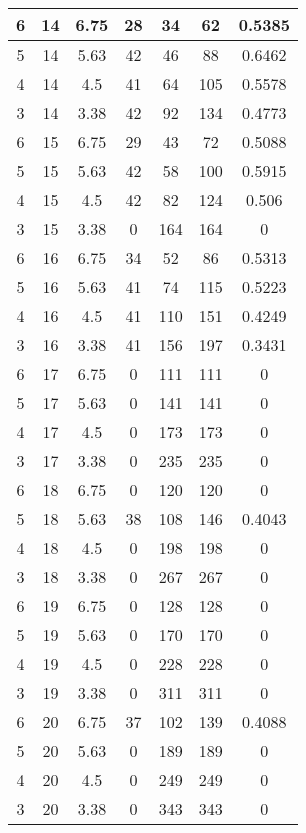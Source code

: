 \documentclass[letterpaper, 12pt]{article}
\begin{document}
\begin{longtable}{|c|c|c|c|c|c|c|}
\hline
6 & 14 & 6.75 & 28 & 34 & 62 & 0.5385 \\
\hline
5 & 14 & 5.63 & 42 & 46 & 88 & 0.6462 \\
\hline
4 & 14 & 4.5 & 41 & 64 & 105 & 0.5578 \\
\hline
3 & 14 & 3.38 & 42 & 92 & 134 & 0.4773 \\
\hline
6 & 15 & 6.75 & 29 & 43 & 72 & 0.5088 \\
\hline
5 & 15 & 5.63 & 42 & 58 & 100 & 0.5915 \\
\hline
4 & 15 & 4.5 & 42 & 82 & 124 & 0.506 \\
\hline
3 & 15 & 3.38 & 0 & 164 & 164 & 0 \\
\hline
6 & 16 & 6.75 & 34 & 52 & 86 & 0.5313 \\
\hline
5 & 16 & 5.63 & 41 & 74 & 115 & 0.5223 \\
\hline
4 & 16 & 4.5 & 41 & 110 & 151 & 0.4249 \\
\hline
3 & 16 & 3.38 & 41 & 156 & 197 & 0.3431 \\
\hline
6 & 17 & 6.75 & 0 & 111 & 111 & 0 \\
\hline
5 & 17 & 5.63 & 0 & 141 & 141 & 0 \\
\hline
4 & 17 & 4.5 & 0 & 173 & 173 & 0 \\
\hline
3 & 17 & 3.38 & 0 & 235 & 235 & 0 \\
\hline
6 & 18 & 6.75 & 0 & 120 & 120 & 0 \\
\hline
5 & 18 & 5.63 & 38 & 108 & 146 & 0.4043 \\
\hline
4 & 18 & 4.5 & 0 & 198 & 198 & 0 \\
\hline
3 & 18 & 3.38 & 0 & 267 & 267 & 0 \\
\hline
6 & 19 & 6.75 & 0 & 128 & 128 & 0 \\
\hline
5 & 19 & 5.63 & 0 & 170 & 170 & 0 \\
\hline
4 & 19 & 4.5 & 0 & 228 & 228 & 0 \\
\hline
3 & 19 & 3.38 & 0 & 311 & 311 & 0 \\
\hline
6 & 20 & 6.75 & 37 & 102 & 139 & 0.4088 \\
\hline
5 & 20 & 5.63 & 0 & 189 & 189 & 0 \\
\hline
4 & 20 & 4.5 & 0 & 249 & 249 & 0 \\
\hline
3 & 20 & 3.38 & 0 & 343 & 343 & 0 \\
\hline
\end{longtable}
\end{document}
